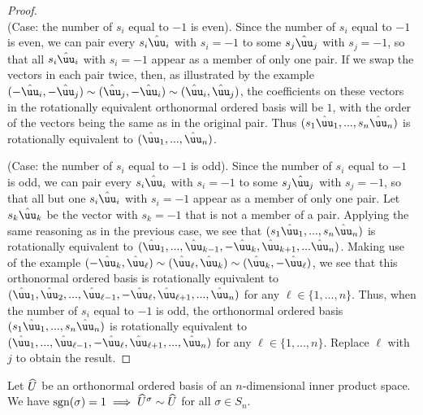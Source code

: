 \begin{proof}
    \mbox{} \\
    
    (Case: the number of $s_i$ equal to $-1$ is even). Since the number of $s_i$ equal to $-1$ is even, we can pair every $s_i \huu_i$ with $s_i = -1$ to some $s_j \huu_j$ with $s_j = -1$, so that all $s_i \huu_i$ with $s_i = -1$ appear as a member of only one pair. If we swap the vectors in each pair twice, then, as illustrated by the example $(-\huu_i, -\huu_j) \sim (\huu_j, -\huu_i) \sim (\huu_i, \huu_j)$, the coefficients on these vectors in the rotationally equivalent orthonormal ordered basis will be $1$, with the order of the vectors being the same as in the original pair. Thus $(s_1 \huu_1, ..., s_n \huu_n)$ is rotationally equivalent to $(\huu_1, ..., \huu_n)$.

    (Case: the number of $s_i$ equal to $-1$ is odd). Since the number of $s_i$ equal to $-1$ is odd, we can pair every $s_i \huu_i$ with $s_i = -1$ to some $s_j \huu_j$ with $s_j = -1$, so that all but one $s_i \huu_i$ with $s_i = -1$ appear as a member of only one pair. Let $s_k \huu_k$ be the vector with $s_k = -1$ that is not a member of a pair. Applying the same reasoning as in the previous case, we see that $(s_1 \huu_1, ..., s_n \huu_n)$ is rotationally equivalent to $(\huu_1, ..., \huu_{k - 1}, -\huu_k, \huu_{k + 1}, ... \huu_n)$. Making use of the example $(-\huu_k, \huu_\ell) \sim (\huu_\ell, \huu_k) \sim (\huu_k, -\huu_\ell)$, we see that this orthonormal ordered basis is rotationally equivalent to $(\huu_1, \huu_2, ..., \huu_{\ell - 1}, -\huu_\ell, \huu_{\ell + 1}, ..., \huu_n)$ for any $\ell \in \{1, ..., n\}$. Thus, when the number of $s_i$ equal to $-1$ is odd, the orthonormal ordered basis $(s_1 \huu_1, ..., s_n \huu_n)$ is rotationally equivalent to $(\huu_1, ..., \huu_{\ell - 1}, -\huu_\ell, \huu_{\ell + 1}, ..., \huu_n)$ for any $\ell \in \{1, ..., n\}$. Replace $\ell$ with $j$ to obtain the result.
\end{proof}

\begin{lemma}
    Let $\widehat{U}$ be an orthonormal ordered basis of an $n$-dimensional inner product space. We have $\text{sgn}(\sigma) = 1 \implies \widehat{U}^\sigma \sim \widehat{U}$ for all $\sigma \in S_n$.
\end{lemma}

